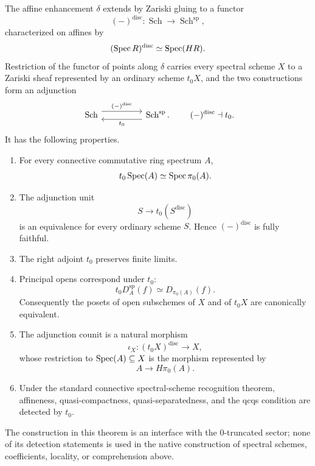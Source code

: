 \begin{theorem}
\label{thm:global-zero-truncated-reconstruction}
The affine enhancement \(\delta\) extends by Zariski gluing to a functor
\[
    (-)^{\mathrm{disc}}:
    \operatorname{Sch}
    \longrightarrow
    \operatorname{Sch}^{\mathrm{sp}},
\]
characterized on affines by
\[
    (\operatorname{Spec} R)^{\mathrm{disc}}
    \simeq
    \operatorname{Spec}(HR).
\]
Restriction of the functor of points along \(\delta\) carries every spectral
scheme \(X\) to a Zariski sheaf represented by an ordinary scheme \(t_0X\),
and the two constructions form an adjunction
\[
\begin{tikzcd}[column sep=huge]
    \operatorname{Sch}
        \arrow[r, shift left=1.1ex, "{(-)^{\mathrm{disc}}}"]
    &
    \operatorname{Sch}^{\mathrm{sp}}
        \arrow[l, swap, shift left=1.1ex, "t_0"'].
\end{tikzcd}
\qquad
(-)^{\mathrm{disc}}\dashv t_0.
\]
It has the following properties.
\begin{enumerate}[label=(\roman*)]
    \item For every connective commutative ring spectrum \(A\),
    \[
        t_0\operatorname{Spec}(A)
        \simeq
        \operatorname{Spec}\pi_0(A).
    \]

    \item The adjunction unit
    \[
        S\longrightarrow t_0(S^{\mathrm{disc}})
    \]
    is an equivalence for every ordinary scheme \(S\). Hence
    \((-)^{\mathrm{disc}}\) is fully faithful.

    \item The right adjoint \(t_0\) preserves finite limits.

    \item Principal opens correspond under \(t_0\):
    \[
        t_0D_A^{\mathrm{sp}}(f)
        \simeq
        D_{\pi_0(A)}(f).
    \]
    Consequently the posets of open subschemes of \(X\) and of \(t_0X\) are
    canonically equivalent.

    \item The adjunction counit is a natural morphism
    \[
        \iota_X:
        (t_0X)^{\mathrm{disc}}
        \longrightarrow
        X,
    \]
    whose restriction to \(\operatorname{Spec}(A)\subseteq X\) is the morphism represented
    by
    \[
        A\longrightarrow H\pi_0(A).
    \]

    \item Under the standard connective spectral-scheme recognition theorem,
    affineness, quasi-compactness, quasi-separatedness, and the qcqs condition
    are detected by \(t_0\).
\end{enumerate}
The construction in this theorem is an interface with the \(0\)-truncated
sector; none of its detection statements is used in the native construction
of spectral schemes, coefficients, locality, or comprehension above.
\end{theorem}

